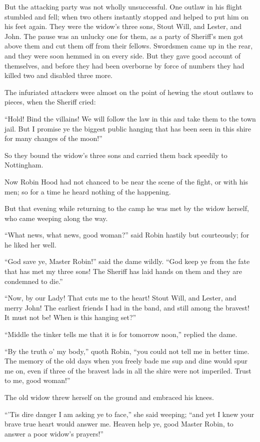But the attacking party was not wholly unsuccessful. One outlaw in his
flight stumbled and fell; when two others instantly stopped and helped
to put him on his feet again. They were the widow's three sons, Stout
Will, and Lester, and John. The pause was an unlucky one for them, as a
party of Sheriff's men got above them and cut them off from their
fellows. Swordsmen came up in the rear, and they were soon hemmed in on
every side. But they gave good account of themselves, and before they
had been overborne by force of numbers they had killed two and disabled
three more.

The infuriated attackers were almost on the point of hewing the stout
outlaws to pieces, when the Sheriff cried:

``Hold! Bind the villains! We will follow the law in this and take them
to the town jail. But I promise ye the biggest public hanging that has
been seen in this shire for many changes of the moon!''

So they bound the widow's three sons and carried them back speedily to
Nottingham.

Now Robin Hood had not chanced to be near the scene of the fight, or
with his men; so for a time he heard nothing of the happening.

But that evening while returning to the camp he was met by the widow
herself, who came weeping along the way.

``What news, what news, good woman?'' said Robin hastily but
courteously; for he liked her well.

``God save ye, Master Robin!'' said the dame wildly. ``God keep ye from
the fate that has met my three sons! The Sheriff has laid hands on them
and they are condemned to die.''

``Now, by our Lady! That cuts me to the heart! Stout Will, and Lester,
and merry John! The earliest friends I had in the band, and still among
the bravest! It must not be! When is this hanging set?''

``Middle the tinker tells me that it is for tomorrow noon,'' replied the
dame.

``By the truth o' my body,'' quoth Robin, ``you could not tell me in
better time. The memory of the old days when you freely bade me sup and
dine would spur me on, even if three of the bravest lads in all the
shire were not imperiled. Trust to me, good woman!''

The old widow threw herself on the ground and embraced his knees.

``'Tis dire danger I am asking ye to face,'' she said weeping; ``and yet
I knew your brave true heart would answer me. Heaven help ye, good
Master Robin, to answer a poor widow's prayers!''

